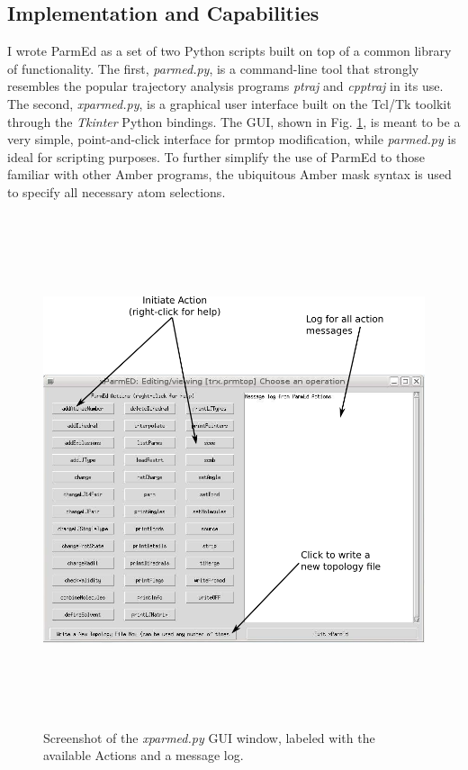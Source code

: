 \subsection{Implementation and Capabilities}

I wrote ParmEd as a set of two Python scripts built on top of a common library
of functionality. The first, \emph{parmed.py}, is a command-line tool that
strongly resembles the popular trajectory analysis programs \emph{ptraj} and
\emph{cpptraj} in its use. The second, \emph{xparmed.py}, is a graphical user
interface built on the Tcl/Tk toolkit through the \emph{Tkinter} Python
bindings. The GUI, shown in Fig. \ref{fig6:xparmed}, is meant to be a very
simple, point-and-click interface for prmtop modification, while
\emph{parmed.py} is ideal for scripting purposes. To further simplify the use of
ParmEd to those familiar with other Amber programs, the ubiquitous Amber mask
syntax is used to specify all necessary atom selections.

\begin{figure}
   \includegraphics[width=6.5in, height=5.91in]{xparmed.png}
   \caption{Screenshot of the \emph{xparmed.py} GUI window, labeled with the
            available Actions and a message log.}
   \label{fig6:xparmed}
\end{figure}

